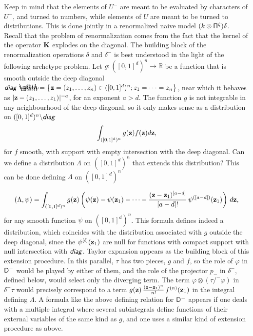 \documentclass[10pt, reqno]{amsart}
\makeatletter
\numberwithin{subsection}{section}
\numberwithin{subsubsection}{subsection}
\numberwithin{equation}{section} %
\newenvironment{Rem}[1][\unskip]{%
    \begin{list}{\hspace{1.15cm}{\textsf{\textbf{{\small \textsl{Remark}} 
--}}}}{%
        \setlength{\topsep}{0pt}%
        \setlength{\leftmargin}{0pt}%
        \setlength{\rightmargin}{0pt}%
        \setlength{\listparindent}{0pt}%
        \setlength{\itemindent}{0pt}%
        \setlength{\parsep}{0pt}%
        \addtolength{\leftmargin}{0pt}%
        \addtolength{\rightmargin}{0pt}%
    } \item }{\hfill \end{list}\smallskip}
\theoremstyle{mystyle}
\theoremstyle{mystyle2}
\theoremstyle{mystyle3}
\newcommand\bbR{\mathbb{R}}
\newcommand*{\defeq}{\mathrel{\rlap{%
                     \raisebox{0.3ex}{$\m@th\cdot$}}%
                     \raisebox{-0.3ex}{$\m@th\cdot$}}%
                     =}
\makeatother
\begin{document}
{\sl  \begin{Rem}
Keep in mind that the elements of $U^-$ are meant to be evaluated by characters of $U^-$, and turned to numbers, while elements of $U$ are meant to be turned to distributions. This is done jointly in a renormalized naive model $(k\otimes{\sf\Pi}^\zeta)\delta$. Recall that the problem of renormalization comes from the fact that the kernel of the operator $\bf K$ explodes on the diagonal. The building block of the renormalization operations $\delta$ and $\delta^-$ is best understood in the light of the following archetype problem. Let $g : ([0,1]^d)^n\rightarrow\bbR$ be a function that is smooth outside the deep diagonal $\textsf{\emph{diag}} \defeq  \big\{{\bf z}=(z_1,\dots,z_n)\in([0,1]^d)^n; z_1=\cdots=z_n\big\}$, near which it behaves as $\vert {\bf z} - (z_1,\dots,z_1)\vert^{-a}$, for an exponent $a>d$. The function $g$ is not integrable in any neighbourhood 
of the deep diagonal, so it only makes sense as a distribution on $([0,1]^d)^n\backslash\textsf{\emph{diag}}$
\begin{equation*}
\int_{([0,1]^d)^n} g({\bf z})f({\bf z})d{\bf z},
\end{equation*}
for $f$ smooth, with support with empty intersection with the deep diagonal. Can we define a distribution $\Lambda$ on $([0,1]^d)^n$ that extends this distribution? This can be done defining $\Lambda$ on $([0,1]^d)^n$

\begin{equation*} 
(\Lambda, \psi) = \int_{([0,1]^d)^n} g({\bf z})\left(\psi({\bf z}) - \psi({\bf z}_1) -\cdots-\frac{({\bf z}-{\bf z}_1)^{[a-d]}}{[a-d]!}\,\psi^{([a-d])}({\bf z}_1)\right)\,d{\bf z},
\end{equation*}
for any smooth function $\psi$ on $([0,1]^d)^n$. This formula defines indeed a distribution, which coincides with the distribution associated with 
$g$ outside the deep diagonal, since the $\psi^{[\ell]}({\bf z}_1)$ are null for functions with compact support with null intersection with $\textsf{\emph{diag}}$. Taylor expansion appears as the building block of this extension procedure. In this parallel, $\tau$ has two pieces, $g$ and $f$, so the role of $\varphi$ in ${\sf D}^-$ would be played by either of them, and the role of the projector $p_-$ in $\delta^-$, defined below, would select only the diverging term. The term $\varphi\otimes(\tau/^-\varphi)$ in $\delta^-\tau$ would precisely correspond to a term $g({\bf z})\,\frac{({\bf z}-{\bf z}_1)^n}{n!}\,f^{(n)}({\bf z}_1)$ in the integral defining $\Lambda$. A formula like the above defining relation for ${\sf D}^-$ appears if one deals with a multiple integral where several subintegrals define functions of their external variables of the same kind as $g$, 
and one uses a similar kind of extension procedure as above.   
\end{Rem} }
\end{document}
